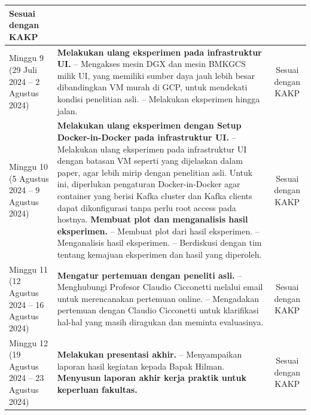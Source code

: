 \begin{longtable}{|p{2.6cm}|p{8cm}|c|}
	Sesuai dengan KAKP \\
	\hline
    Minggu 9\newline
	(29 Juli 2024 -- 2 Agustus 2024) &
	\textbf{Melakukan ulang eksperimen pada infrastruktur UI.}\newline
	-- Mengakses mesin DGX dan mesin BMKGCS milik UI, yang memiliki sumber daya jauh lebih besar dibandingkan VM murah di GCP, untuk mendekati kondisi penelitian asli.\newline
	-- Melakukan eksperimen hingga jalan.\vspace{0.5cm} &
	Sesuai dengan KAKP \\
	\hline
    Minggu 10\newline
	(5 Agustus 2024 -- 9 Agustus 2024) &
	\textbf{Melakukan ulang eksperimen dengan Setup	Docker-in-Docker pada infrastruktur UI.}\newline
	-- Melakukan ulang eksperimen pada infrastruktur UI	dengan batasan VM seperti yang dijelaskan dalam paper, agar lebih mirip dengan penelitian asli. Untuk ini, diperlukan pengaturan Docker-in-Docker agar container yang berisi Kafka cluster dan Kafka clients dapat dikonfigurasi tanpa perlu root access pada hostnya.\vspace{0.5cm}\newline
	\textbf{Membuat plot dan menganalisis hasil eksperimen.}\newline
	-- Membuat plot dari hasil eksperimen.\newline
	-- Menganalisis hasil eksperimen.\newline
	-- Berdiskusi dengan tim tentang kemajuan eksperimen dan hasil yang diperoleh.\vspace{0.5cm} &
	Sesuai dengan KAKP \\
	\hline
    Minggu 11\newline
	(12 Agustus 2024 -- 16 Agustus 2024) &
	\textbf{Mengatur pertemuan dengan peneliti asli.}\newline
	-- Menghubungi Profesor Claudio Cicconetti melalui email untuk merencanakan pertemuan online.\newline
	-- Mengadakan pertemuan dengan Claudio Cicconetti untuk klarifikasi hal-hal yang masih diragukan dan meminta evaluasinya.\vspace{0.5cm} &
	Sesuai dengan KAKP \\
	\hline
    Minggu 12\newline
	(19 Agustus 2024 -- 23 Agustus 2024) &
	\textbf{Melakukan presentasi akhir.}\newline
	-- Menyampaikan laporan hasil kegiatan kepada Bapak Hilman.\vspace{0.5cm}\newline
	\textbf{Menyusun laporan akhir kerja praktik untuk keperluan fakultas.}\vspace{0.5cm} &
	Sesuai dengan KAKP \\
    \hline
\end{longtable}

